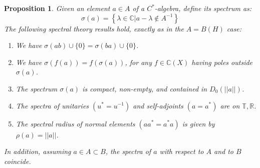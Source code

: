 \documentclass[12pt]{amsbook}
\newtheorem{proposition}[theorem]{Proposition}
\begin{document}
\begin{proposition}
Given an element $a\in A$ of a $C^*$-algebra, define its spectrum as:
$$\sigma(a)=\left\{\lambda\in\mathbb C\Big|a-\lambda\notin A^{-1}\right\}$$
The following spectral theory results hold, exactly as in the $A=B(H)$ case:
\begin{enumerate}
\item We have $\sigma(ab)\cup\{0\}=\sigma(ba)\cup\{0\}$.

\item We have $\sigma(f(a))=f(\sigma(a))$, for any $f\in\mathbb C(X)$ having poles outside $\sigma(a)$.

\item The spectrum $\sigma(a)$ is compact, non-empty, and contained in $D_0(||a||)$.

\item The spectra of unitaries $(u^*=u^{-1})$ and self-adjoints $(a=a^*)$ are on $\mathbb T,\mathbb R$.

\item The spectral radius of normal elements $(aa^*=a^*a)$ is given by $\rho(a)=||a||$.
\end{enumerate}
In addition, assuming $a\in A\subset B$, the spectra of $a$ with respect to $A$ and to $B$ coincide.
\end{proposition}
\end{document}
